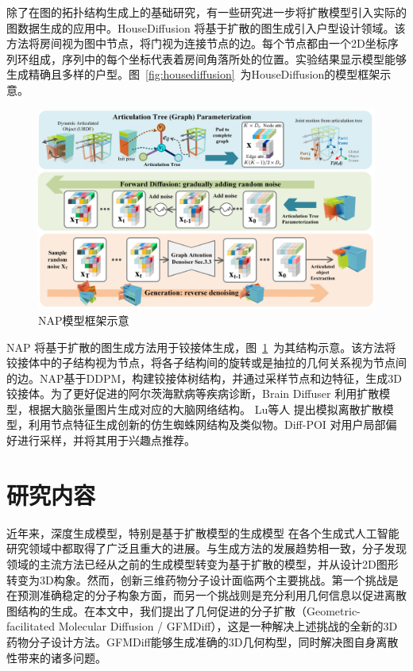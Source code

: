 除了在图的拓扑结构生成上的基础研究，有一些研究进一步将扩散模型引入实际的图数据生成的应用中。HouseDiffusion \cite{housediffusion_shabani_23}将基于扩散的图生成引入户型设计领域。该方法将房间视为图中节点，将门视为连接节点的边。每个节点都由一个2D坐标序列环组成，序列中的每个坐标代表着房间角落所处的位置。实验结果显示模型能够生成精确且多样的户型。图~\ref{fig:housediffusion}~为HouseDiffusion的模型框架示意。

\begin{figure}[h]
  \centering
  \includegraphics[width=1.0\linewidth]{figures/nap.jpg}
  \caption{NAP模型框架示意 \cite{nap_lei_23}}
  \label{fig:nap}
\end{figure}

NAP \cite{nap_lei_23}将基于扩散的图生成方法用于铰接体生成，图~\ref{fig:nap}~为其结构示意。该方法将铰接体中的子结构视为节点，将各子结构间的旋转或是抽拉的几何关系视为节点间的边。NAP基于DDPM，构建铰接体树结构，并通过采样节点和边特征，生成3D铰接体。为了更好促进的阿尔茨海默病等疾病诊断，Brain Diffuser \cite{braindiffuser_chen_23}利用扩散模型，根据大脑张量图片生成对应的大脑网络结构。 Lu等人 \cite{modeling_lu_23}提出模拟离散扩散模型，利用节点特征生成创新的仿生蜘蛛网结构及类似物。Diff-POI \cite{diffpoi_qin_23}对用户局部偏好进行采样，并将其用于兴趣点推荐。

\section{研究内容}
近年来，深度生成模型，特别是基于扩散模型的生成模型 \cite{ddpm_ho_20,sgm_song_19,scoresde_song_21}在各个生成式人工智能研究领域中都取得了广泛且重大的进展。与生成方法的发展趋势相一致，分子发现领域的主流方法已经从之前的生成模型转变为基于扩散的模型，并从设计2D图形转变为3D构象。然而，创新三维药物分子设计面临两个主要挑战。第一个挑战是在预测准确稳定的分子构象方面，而另一个挑战则是充分利用几何信息以促进离散图结构的生成。在本文中，我们提出了几何促进的分子扩散（Geometric-facilitated Molecular Diffusion / GFMDiff），这是一种解决上述挑战的全新的3D药物分子设计方法。GFMDiff能够生成准确的3D几何构型，同时解决图自身离散性带来的诸多问题。

